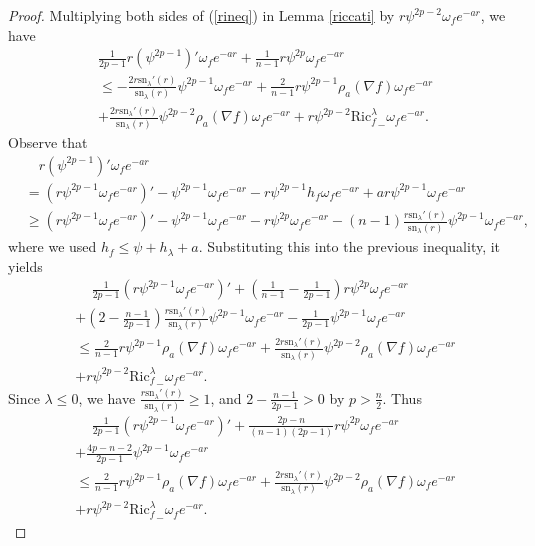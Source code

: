 \documentclass[10pt,a4paper]{amsart}
\newcommand{\sn}{\mathrm{sn}}
\begin{document}
\begin{proof}
	Multiplying both sides of  (\ref{rineq}) in Lemma \ref{riccati} by $r\psi^{2p-2}\omega_fe^{-ar}$, we have
	\begin{align*}
		&\frac{1}{2p-1}r(\psi^{2p-1})'\omega_fe^{-ar}+\frac{1}{n-1}r\psi^{2p}\omega_fe^{-ar}\\&\leq -\frac{2r\sn_\lambda'(r)}{\sn_\lambda(r)}\psi^{2p-1}\omega_fe^{-ar}+\frac{2}{n-1}r\psi^{2p-1}\rho_a(\nabla f)\omega_fe^{-ar}\\&+\frac{2r\sn_\lambda'(r)}{\sn_\lambda(r)}\psi^{2p-2}\rho_a(\nabla f)\omega_fe^{-ar}+r\psi^{2p-2}{\mathrm{Ric}^\lambda_f}_-\omega_fe^{-ar}.
	\end{align*}
	Observe that
	\begin{align*}
		&\quad r(\psi^{2p-1})'\omega_fe^{-ar}\\&=(r\psi^{2p-1}\omega_fe^{-ar})'-\psi^{2p-1}\omega_fe^{-ar}-r\psi^{2p-1}h_f\omega_fe^{-ar}+ar\psi^{2p-1}\omega_fe^{-ar}\\
		&\geq (r\psi^{2p-1}\omega_fe^{-ar})'-\psi^{2p-1}\omega_fe^{-ar}-r\psi^{2p}\omega_fe^{-ar}-(n-1)\frac{r\sn_\lambda'(r)}{\sn_\lambda(r)}\psi^{2p-1}\omega_fe^{-ar},
	\end{align*}
	where we used $h_f\leq \psi+h_\lambda+a$. Substituting this into the previous inequality, it yields
	\begin{equation*}
		\begin{aligned}
			&\quad\,\frac{1}{2p-1}(r\psi^{2p-1}\omega_fe^{-ar})'+\left(\frac{1}{n-1}-\frac{1}{2p-1}\right)r\psi^{2p}\omega_fe^{-ar}\\
			&+\left(2-\frac{n-1}{2p-1}\right)\frac{r\sn_\lambda'(r)}{\sn_\lambda(r)}\psi^{2p-1}\omega_fe^{-ar}-\frac{1}{2p-1}\psi^{2p-1}\omega_fe^{-ar}\\
			&\leq \frac{2}{n-1}r\psi^{2p-1}\rho_a(\nabla f)\omega_fe^{-ar}+\frac{2r\sn_\lambda'(r)}{\sn_\lambda(r)}\psi^{2p-2}\rho_a(\nabla f)\omega_fe^{-ar}\\
			&+r\psi^{2p-2}{\mathrm{Ric}^\lambda_f}_-\omega_fe^{-ar}.
		\end{aligned}
	\end{equation*}
	Since $\lambda\leq 0$, we have $\frac{r\sn_\lambda'(r)}{\sn_\lambda(r)}\geq 1$, and $2-\frac{n-1}{2p-1}>0$ by $p>\frac{n}{2}$. Thus
	\begin{equation}
		\begin{aligned}
			&\quad\,\frac{1}{2p-1}(r\psi^{2p-1}\omega_fe^{-ar})'+\frac{2p-n}{(n-1)(2p-1)}r\psi^{2p}\omega_fe^{-ar}\\
			&+\frac{4p-n-2}{2p-1}\psi^{2p-1}\omega_fe^{-ar}\\
			&\leq \frac{2}{n-1}r\psi^{2p-1}\rho_a(\nabla f)\omega_fe^{-ar}+\frac{2r\sn_\lambda'(r)}{\sn_\lambda(r)}\psi^{2p-2}\rho_a(\nabla f)\omega_fe^{-ar}\\
			&+r\psi^{2p-2}{\mathrm{Ric}^\lambda_f}_-\omega_fe^{-ar}.\label{rineq-deal}
		\end{aligned}
	\end{equation}
	

\end{proof}
\end{document}
